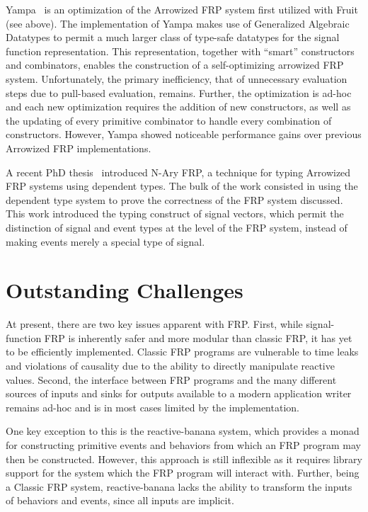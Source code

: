 Yampa~\cite{Nilsson2005} is an optimization of the Arrowized FRP system first
utilized with Fruit (see above). The implementation of Yampa makes use of
Generalized Algebraic Datatypes to permit a much larger class of type-safe
datatypes for the signal function representation. This representation,
together with ``smart'' constructors and combinators, enables the construction
of a self-optimizing arrowized FRP system. Unfortunately, the primary
inefficiency, that of unnecessary evaluation steps due to pull-based evaluation,
remains. Further, the optimization is ad-hoc and each new optimization requires
the addition of new constructors, as well as the updating of every primitive
combinator to handle every combination of constructors. However, Yampa showed
noticeable performance gains over previous Arrowized FRP implementations.

A recent PhD thesis~\cite{Sculthorpe2011} introduced N-Ary FRP, a technique for
typing Arrowized FRP systems using dependent types. The bulk of the work
consisted in using the dependent type system to prove the correctness of the FRP
system discussed. This work introduced the typing construct of signal vectors,
which permit the distinction of signal and event types at the level of the FRP
system, instead of making events merely a special type of signal.

\section{Outstanding Challenges}
\label{section:Background-outstanding_challenges}

At present, there are two key issues apparent with FRP. First, while
signal-function FRP is inherently safer and more modular than classic FRP, it
has yet to be efficiently implemented. Classic FRP programs are vulnerable to
time leaks and violations of causality due to the ability to directly manipulate
reactive values. Second, the interface between FRP programs and the many
different sources of inputs and sinks for outputs available to a modern
application writer remains ad-hoc and is in most cases limited by the
implementation.

One key exception to this is the reactive-banana system, which provides a monad
for constructing primitive events and behaviors from which an FRP program may
then be constructed. However, this approach is still inflexible as it requires
library support for the system which the FRP program will interact with.
Further, being a Classic FRP system, reactive-banana lacks the ability to
transform the inputs of behaviors and events, since all inputs are implicit.
